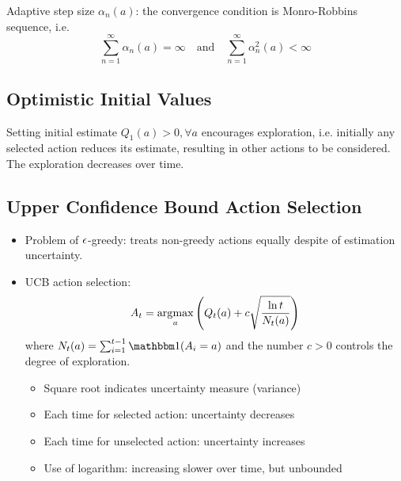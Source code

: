 Adaptive step size $\alpha_n(a)$: the convergence condition is Monro-Robbins sequence, i.e.
\begin{equation}
    \sum_{n=1}^{\infty}\alpha_n(a) = \infty \quad \text{and} \quad \sum_{n=1}^{\infty}\alpha_n^2(a) < \infty
\end{equation}

\subsection{Optimistic Initial Values}
Setting initial estimate $Q_1(a) > 0, \forall a$ encourages exploration, i.e. initially any selected action reduces its estimate, resulting in other actions to be considered. The exploration decreases over time. 

\subsection{Upper Confidence Bound Action Selection}
\begin{itemize}
    \item Problem of $\epsilon$-greedy: treats non-greedy actions equally despite of estimation uncertainty. 
    \item UCB action selection:
        \begin{equation}
            A_t = \operatorname*{\arg\!\max}_{a}\left( {Q_t(a) + c\sqrt{\frac{\ln t}{N_t(a)}}} \right)
        \end{equation}
        where $N_t(a)=\sum_{i=1}^{t-1}\indicator(A_i = a)$ and the number $c > 0$ controls the degree of exploration.
        \begin{itemize}
            \item Square root indicates uncertainty measure (variance)
            \item Each time for selected action: uncertainty decreases
            \item Each time for unselected action: uncertainty increases
            \item Use of logarithm: increasing slower over time, but unbounded
        \end{itemize}
\end{itemize}

